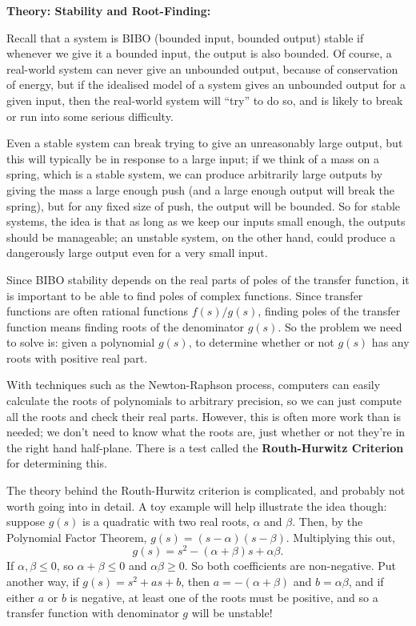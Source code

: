 \documentclass{article}
\begin{document}
\clearpage


\textbf{Theory: Stability and Root-Finding:}\bigskip



Recall that a system is BIBO (bounded input, bounded output) stable if whenever we give it a bounded input, the output is also bounded. Of course, a real-world system can never give an unbounded output, because of conservation of energy, but if the idealised model of a system gives an unbounded output for a given input, then the real-world system will ``try'' to do so, and is likely to break or run into some serious difficulty.

Even a stable system can break trying to give an unreasonably large output, but this will typically be in response to a large input; if we think of a mass on a spring, which is a stable system, we can produce arbitrarily large outputs by giving the mass a large enough push (and a large enough output will break the spring), but for any fixed size of push, the output will be bounded. So for stable systems, the idea is that as long as we keep our inputs small enough, the outputs should be manageable; an unstable system, on the other hand, could produce a dangerously large output even for a very small input.\bigskip


Since BIBO stability depends on the real parts of poles of the transfer function, it is important to be able to find poles of complex functions. Since transfer functions are often rational functions $f(s)/g(s)$, finding poles of the transfer function means finding roots of the denominator $g(s)$. So the problem we need to solve is: given a polynomial $g(s)$, to determine whether or not $g(s)$ has any roots with positive real part.

With techniques such as the Newton-Raphson process, computers can easily calculate the roots of polynomials to arbitrary precision, so we can just compute all the roots and check their real parts. However, this is often more work than is needed; we don't need to know what the roots are, just whether or not they're in the right hand half-plane. There is a test called the \textbf{Routh-Hurwitz Criterion} for determining this.\bigskip


The theory behind the Routh-Hurwitz criterion is complicated, and probably not worth going into in detail. A toy example will help illustrate the idea though: suppose $g(s)$ is a quadratic with two real roots, $\alpha$ and $\beta$. Then, by the Polynomial Factor Theorem, $g(s)=(s-\alpha)(s-\beta)$. Multiplying this out,
\[g(s)= s^2-(\alpha+\beta)s +  \alpha\beta.\]
If $\alpha,\beta \leq 0$, so $\alpha+\beta\leq 0$ and $\alpha\beta\geq 0$. So both coefficients are non-negative. Put another way, if $g(s)=s^2+as+b$, then $a=-(\alpha+\beta)$ and $b=\alpha\beta$, and if either $a$ or $b$ is negative, at least one of the roots must be positive, and so a transfer function with denominator $g$ will be unstable!
\end{document}
